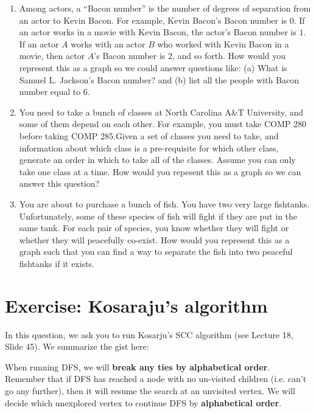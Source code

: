 \documentclass [12pt]{article}
\begin{document}
\begin{enumerate}
    \item {} Among actors, a ``Bacon number'' is the number of degrees of separation from an actor to Kevin Bacon. For example, Kevin Bacon's Bacon number is $0$. If an actor works in a movie with Kevin Bacon, the actor's Bacon number is $1$. If an actor $A$ works with an actor $B$ who worked with Kevin Bacon in a movie, then actor $A$'s Bacon number is $2$, and so forth. How would you represent this as a graph so we could answer questions like: (a) What is Samuel L. Jackson's Bacon number? and (b) list all the people with Bacon number equal to 6.

    \item {} You need to take a bunch of classes at North Carolina A\&T University, and some of them depend on each other. For example, you must take COMP 280 before taking COMP 285.Given a set of classes you need to take, and information about which class is a pre-requisite for which other class, generate an order in which to take all of the classes. Assume you can only take one class at a time. How would you repesent this as a graph so we can answer this question?

    \item {} You are about to purchase a bunch of fish. You have two very large fishtanks. Unfortunately, some of these species of fish will fight if they are put in the same tank. For each pair of species, you know whether they will fight or whether they will peacefully co-exist. How would you represent this as a graph such that you can find a way to separate the fish into two peaceful fishtanks if it exists.
\end{enumerate}


\pagebreak
\section{Exercise: Kosaraju’s algorithm }
\begin{center}
    
\end{center}

In this question, we ask you to run Kosarju's SCC algorithm (see Lecture 18, Slide 45). We summarize the gist here:

When running DFS, we will \textbf{break any ties by alphabetical order}. Remember that if DFS has reached a node with no un-visited children (i.e. can’t go any further), then it will resume the search at an unvisited vertex. We will decide which unexplored vertex to continue DFS by \textbf{alphabetical order}.
\end{document}
